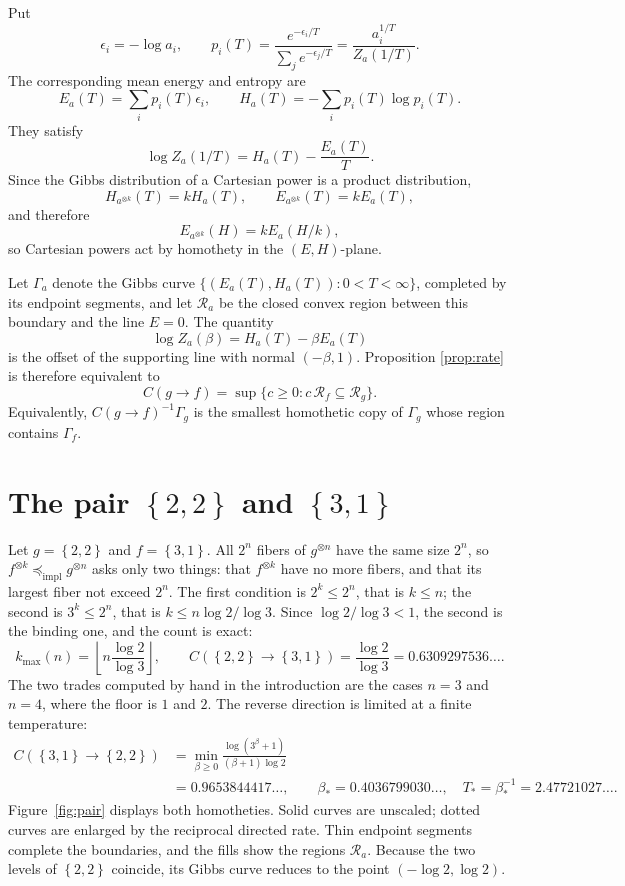 \documentclass[11pt]{article}
\theoremstyle{definition}
\theoremstyle{remark}
\newcommand{\sig}[1]{\left\{#1\right\}}
\newcommand{\impl}{\preccurlyeq_{\mathrm{impl}}}
\begin{document}
Put
\[
  \epsilon_i=-\log a_i,\qquad
  p_i(T)
  =\frac{e^{-\epsilon_i/T}}{\sum_j e^{-\epsilon_j/T}}
  =\frac{a_i^{1/T}}{Z_a(1/T)}.
\]
The corresponding mean energy and entropy are
\[
  E_a(T)=\sum_i p_i(T)\epsilon_i,\qquad
  H_a(T)=-\sum_i p_i(T)\log p_i(T).
\]
They satisfy
\[
  \log Z_a(1/T)=H_a(T)-\frac{E_a(T)}{T}.
\]
Since the Gibbs distribution of a Cartesian power is a product distribution,
\[
 H_{a^{\otimes k}}(T)=kH_a(T),\qquad
 E_{a^{\otimes k}}(T)=kE_a(T),
\]
and therefore
\[
 E_{a^{\otimes k}}(H)=kE_a(H/k),
\]
so Cartesian powers act by homothety in the \((E,H)\)-plane.

Let \(\Gamma_a\) denote the Gibbs curve
\(\{(E_a(T),H_a(T)):0<T<\infty\}\), completed by its endpoint segments, and
let \(\mathcal R_a\) be the closed convex region between this boundary and
the line \(E=0\).  The quantity
\[
  \log Z_a(\beta)=H_a(T)-\beta E_a(T)
\]
is the offset of the supporting line with normal \((-\beta,1)\).  Proposition
\ref{prop:rate} is therefore equivalent to
\[
 C(g\to f)
 =\sup\{c\geq0:c\,\mathcal R_f\subseteq\mathcal R_g\}.
\]
Equivalently, \(C(g\to f)^{-1}\Gamma_g\) is the smallest homothetic copy of
\(\Gamma_g\) whose region contains \(\Gamma_f\).

\section{The pair
\texorpdfstring{\(\sig{2,2}\) and \(\sig{3,1}\)}
{{2,2} and {3,1}}}
\label{sec:pair}

Let \(g=\sig{2,2}\) and \(f=\sig{3,1}\).  All \(2^n\) fibers of
\(g^{\otimes n}\) have the same size \(2^n\), so \(f^{\otimes k}\impl
g^{\otimes n}\) asks only two things: that \(f^{\otimes k}\) have no more
fibers, and that its largest fiber not exceed \(2^n\).  The first condition is
\(2^k\leq2^n\), that is \(k\leq n\); the second is \(3^k\leq2^n\), that is
\(k\leq n\log2/\log3\).  Since \(\log2/\log3<1\), the second is the binding
one, and the count is exact:
\[
  k_{\max}(n)=\left\lfloor n\frac{\log2}{\log3}\right\rfloor,
  \qquad
  C(\sig{2,2}\to\sig{3,1})
  =\frac{\log2}{\log3}
  =0.6309297536\ldots.
\]
The two trades computed by hand in the introduction are the cases \(n=3\) and
\(n=4\), where the floor is \(1\) and \(2\).
The reverse direction is limited at a finite temperature:
\begin{align*}
  C(\sig{3,1}\to\sig{2,2})
  &=\min_{\beta\geq0}
    \frac{\log(3^\beta+1)}{(\beta+1)\log2} \\
  &=0.9653844417\ldots,
  \qquad
  \beta_*=0.4036799030\ldots,\quad
  T_*=\beta_*^{-1}=2.47721027\ldots.
\end{align*}
Figure~\ref{fig:pair} displays both homotheties.  Solid curves are unscaled;
dotted curves are enlarged by the reciprocal directed rate.  Thin endpoint
segments complete the boundaries, and the fills show the regions
\(\mathcal R_a\).  Because the two levels of \(\sig{2,2}\) coincide, its Gibbs
curve reduces to the point \((-\log2,\log2)\).
\end{document}
